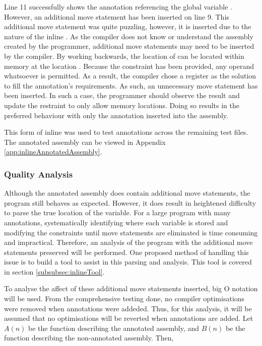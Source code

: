 Line 11 successfully shows the annotation referencing the global variable . However, an additional move statement has been inserted on line 9. This additional move statement was quite puzzling, however, it is inserted due to the nature of the inline . As the compiler does not know or understand the assembly created by the programmer, additional move statements may need to be inserted by the compiler. By working backwards, the location of  can be located within memory at the location . Because the constraint  has been provided, any operand whatsoever is permitted. As a result, the compiler chose a register as the solution to fill the annotation's requirements. As such, an unnecessary move statement has been inserted. In such a case, the programmer should observe the result and update the  restraint to only allow memory locations. Doing so results in the preferred behaviour with only the annotation inserted into the assembly. 

This form of inline  was used to test annotations across the remaining test files. The annotated assembly can be viewed in Appendix \ref{app:inlineAnnotatedAssembly}.

\subsubsection{Quality Analysis}

Although the annotated assembly does contain additional move statements, the program still behaves as expected. However, it does result in heightened difficulty to parse the true location of the variable. For a large program with many annotations, systematically identifying where each variable is stored and modifying the constraints until move statements are eliminated is time consuming and impractical. Therefore, an analysis of the program with the additional move statements preserved will be performed. One proposed method of handling this issue is to build a tool to assist in this parsing and analysis. This tool is covered in section \ref{subsubsec:inlineTool}.

To analyse the affect of these additional move statements inserted, big O notation will be used. From the comprehensive testing done, no compiler optimisations were removed when annotations were addeded. Thus, for this analysis, it will be assumed that no optimisations will be reverted when annotations are added. Let \(A(n)\) be the function describing the annotated assembly, and \(B(n)\) be the function describing the non-annotated assembly. Then,

